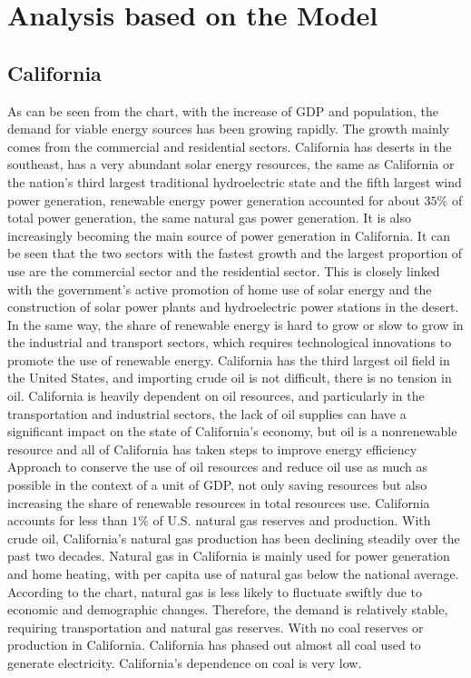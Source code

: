\documentclass{mcmthesis}
\begin{document}
\section{Analysis based on the Model}
\subsection{California}
As can be seen from the chart, with the increase of GDP and population, the demand for viable energy sources has been growing rapidly.
The growth mainly comes from the commercial and residential sectors.
California has deserts in the southeast, has a very abundant solar energy resources,
the same as California or the nation's third largest traditional hydroelectric state and the fifth largest wind power generation,
renewable energy power generation accounted for about $35\%$ of total power generation, the same natural gas power generation.
It is also increasingly becoming the main source of power generation in California.
It can be seen that the two sectors with the fastest growth and the largest proportion of use are the commercial sector and the residential sector.
This is closely linked with the government's active promotion of home use of solar energy and the construction of solar power plants and hydroelectric power stations in the desert.
In the same way, the share of renewable energy is hard to grow or slow to grow in the industrial and transport sectors, which requires technological innovations to promote the use of renewable energy.
California has the third largest oil field in the United States, and importing crude oil is not difficult, there is no tension in oil.
California is heavily dependent on oil resources, and particularly in the transportation and industrial sectors, the lack of oil supplies can have a significant impact on the state of California's economy,
but oil is a nonrenewable resource and all of California has taken steps to improve energy efficiency Approach to conserve the use of oil resources and reduce oil use as much as possible in the context of a unit of GDP,
not only saving resources but also increasing the share of renewable resources in total resources use. California accounts for less than $1\%$ of U.S. natural gas reserves and production.
With crude oil, California's natural gas production has been declining steadily over the past two decades.
Natural gas in California is mainly used for power generation and home heating, with per capita use of natural gas below the national average.
According to the chart, natural gas is less likely to fluctuate swiftly due to economic and demographic changes.
Therefore, the demand is relatively stable, requiring transportation and natural gas reserves. With no coal reserves or production in California.
California has phased out almost all coal used to generate electricity. California's dependence on coal is very low.
\end{document}
